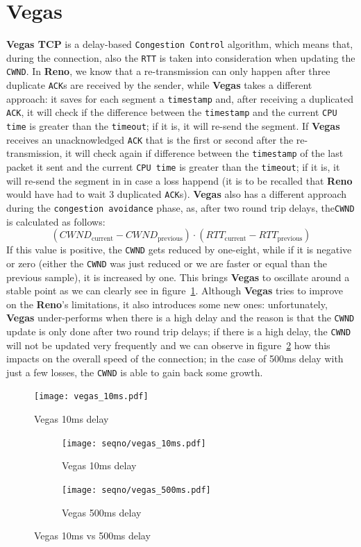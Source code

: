 \documentclass{exam}
\begin{document}
\section{Vegas}
\textbf{Vegas TCP} is a delay-based \texttt{Congestion Control} algorithm, which means that, during the connection, also the \texttt{RTT} is taken into consideration when updating the \texttt{CWND}. In \textbf{Reno}, we know that a re-transmission can only happen after three duplicate \texttt{ACK}s are received by the sender, while \textbf{Vegas} takes a different approach: it saves for each segment a \texttt{timestamp} and, after receiving a duplicated \texttt{ACK}, it will check if the difference between the \texttt{timestamp} and the current \texttt{CPU time} is greater than the \texttt{timeout}; if it is, it will re-send the segment. If \textbf{Vegas} receives an unacknowledged \texttt{ACK} that is the first or second after the re-transmission, it will check again if difference between the \texttt{timestamp} of the last packet it sent and the current \texttt{CPU time} is greater than the \texttt{timeout}; if it is, it will re-send the segment in  in case a loss happend (it is to be recalled that \textbf{Reno} would have had to wait 3 duplicated \texttt{ACK}s). \textbf{Vegas} also has a different approach during the \texttt{congestion avoidance} phase, as, after two round trip delays, the\texttt{CWND} is calculated as follows:
\[
(CWND_{\text{current}} - CWND_{\text{previous}}) \cdot (RTT_{\text{current}} - RTT_{\text{previous}})
\]
If this value is positive, the \texttt{CWND} gets reduced by one-eight, while if it is negative or zero (either the \texttt{CWND} was just reduced or we are faster or equal than the previous sample), it is increased by one. This brings \textbf{Vegas} to oscillate around a stable point as we can clearly see in figure~\ref{fig:vegas-10ms}. Although \textbf{Vegas} tries to improve on the \textbf{Reno}'s limitations, it also introduces some new ones: unfortunately, \textbf{Vegas} under-performs when there is a high delay and the reason is that the \texttt{CWND} update is only done after two round trip delays; if there is a high delay, the \texttt{CWND} will not be updated very frequently and we can observe in figure~\ref{fig:vegas-vegas-delay} how this impacts on the overall speed of the connection; in the case of 500ms delay with just a few losses, the \texttt{CWND} is able to gain back some growth.
\begin{figure}[h]
    \centering
    \texttt{[image: vegas\_10ms.pdf]}
    \caption{Vegas 10ms delay}
    \label{fig:vegas-10ms}
\end{figure}
\begin{figure}[h]
    \centering
    \begin{subfigure}{0.45\textwidth}
        \centering
        \texttt{[image: seqno/vegas\_10ms.pdf]}
        \caption{Vegas 10ms delay}
    \end{subfigure}
    \begin{subfigure}{0.45\textwidth}
        \centering
        \texttt{[image: seqno/vegas\_500ms.pdf]}
        \caption{Vegas 500ms delay}
    \end{subfigure}
    \caption{Vegas 10ms vs 500ms delay}
    \label{fig:vegas-vegas-delay}
\end{figure}
\end{document}
